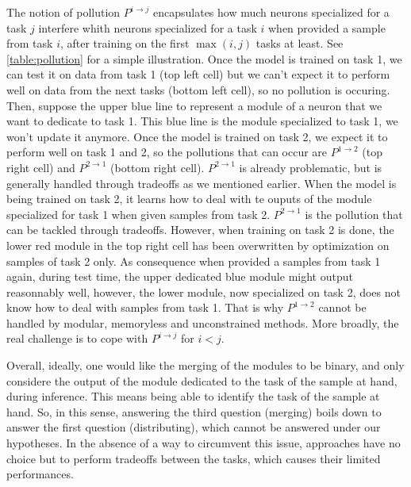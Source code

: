 \documentclass[11pt]{article}
\begin{document}
\vspace{2mm}
\noindent
The notion of pollution $P^{i\rightarrow j}$ encapsulates how much neurons specialized for a task $j$ interfere whith neurons specialized for a task $i$ when provided a sample from task $i$, after training on the first $\max(i,j)$ tasks at least. See \ref{table:pollution} for a simple illustration. Once the model is trained on task 1, we can test it on data from task 1 (top left cell) but we can't expect it to perform well on data from the next tasks (bottom left cell), so no pollution is occuring. Then, suppose the upper blue line to represent a module of a neuron that we want to dedicate to task 1. This blue line is the module specialized to task 1, we won't update it anymore. Once the model is trained on task 2, we expect it to perform well on task 1 and 2, so the pollutions that can occur are $P^{1\rightarrow 2}$ (top right cell) and $P^{2\rightarrow 1}$ (bottom right cell). $P^{2\rightarrow 1}$ is already problematic, but is generally handled through tradeoffs as we mentioned earlier. When the model is being trained on task 2, it learns how to deal with te ouputs of the module specialized for task 1 when given samples from task 2. $P^{2\rightarrow 1}$ is the pollution that can be tackled through tradeoffs. However, when training on task 2 is done, the lower red module in the top right cell has been overwritten by optimization on samples of task 2 only. As consequence when provided a samples from task 1 again, during test time, the upper dedicated blue module might output reasonnably well, however, the lower module, now specialized on task 2, does not know how to deal with samples from task 1. That is why $P^{1\rightarrow 2}$ cannot be handled by modular, memoryless and unconstrained methods. More broadly, the real challenge is to cope with $P^{i\rightarrow j}$ for $i<j$.

\vspace{2mm}
\noindent
Overall, ideally, one would like the merging of the modules to be binary, and only considere the output of the module dedicated to the task of the sample at hand, during inference. This means being able to identify the task of the sample at hand. So, in this sense, answering the third question (merging) boils down to answer the first question (distributing), which cannot be answered under our hypotheses. In the absence of a way to circumvent this issue, approaches have no choice but to perform tradeoffs between the tasks, which causes their limited performances.
\end{document}
